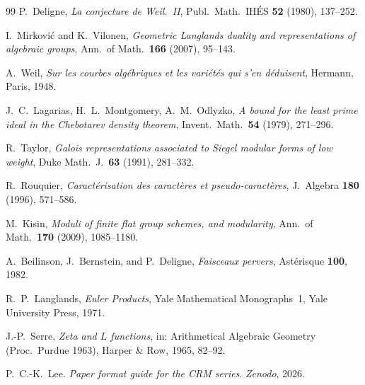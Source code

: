 \documentclass[11pt]{article}
\theoremstyle{plain}
\theoremstyle{definition}
\theoremstyle{remark}
\begin{document}
\begin{thebibliography}{99}
P.~Deligne,
\emph{La conjecture de Weil.\ II},
Publ.\ Math.\ IH\'ES \textbf{52} (1980), 137--252.

I.~Mirkovi\'c and K.~Vilonen,
\emph{Geometric Langlands duality and representations of algebraic groups},
Ann.\ of Math.\ \textbf{166} (2007), 95--143.

A.~Weil,
\emph{Sur les courbes alg\'ebriques et les vari\'et\'es qui s'en d\'eduisent},
Hermann, Paris, 1948.

J.~C.~Lagarias, H.~L.~Montgomery, A.~M.~Odlyzko,
\emph{A bound for the least prime ideal in the Chebotarev density theorem},
Invent.\ Math.\ \textbf{54} (1979), 271--296.

R.~Taylor,
\emph{Galois representations associated to Siegel modular forms of low weight},
Duke Math.\ J.\ \textbf{63} (1991), 281--332.

R.~Rouquier,
\emph{Caract\'erisation des caract\`eres et pseudo-caract\`eres},
J.\ Algebra \textbf{180} (1996), 571--586.

M.~Kisin,
\emph{Moduli of finite flat group schemes, and modularity},
Ann.\ of Math.\ \textbf{170} (2009), 1085--1180.

A.~Beilinson, J.~Bernstein, and P.~Deligne,
\emph{Faisceaux pervers},
Ast\'erisque \textbf{100}, 1982.

R.~P.~Langlands,
\emph{Euler Products},
Yale Mathematical Monographs~1, Yale University Press, 1971.

J.-P.~Serre,
\emph{Zeta and $L$ functions},
in: Arithmetical Algebraic Geometry (Proc.\ Purdue 1963),
Harper \& Row, 1965, 82--92.

P.~C.-K.~Lee.
\emph{Paper format guide for the CRM series}.
\textit{Zenodo}, 2026.

\end{thebibliography}
\end{document}
